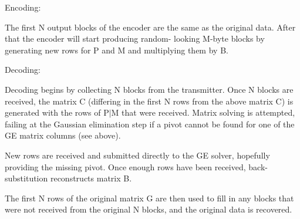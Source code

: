  Encoding\+:

The first N output blocks of the encoder are the same as the original data. After that the encoder will start producing random-\/ looking M-\/byte blocks by generating new rows for P and M and multiplying them by B.

 Decoding\+:

Decoding begins by collecting N blocks from the transmitter. Once N blocks are received, the matrix C\textquotesingle{} (differing in the first N rows from the above matrix C) is generated with the rows of P$\vert$M that were received. Matrix solving is attempted, failing at the Gaussian elimination step if a pivot cannot be found for one of the GE matrix columns (see above).

New rows are received and submitted directly to the GE solver, hopefully providing the missing pivot. Once enough rows have been received, back-\/substitution reconstructs matrix B.

The first N rows of the original matrix G are then used to fill in any blocks that were not received from the original N blocks, and the original data is recovered. 
